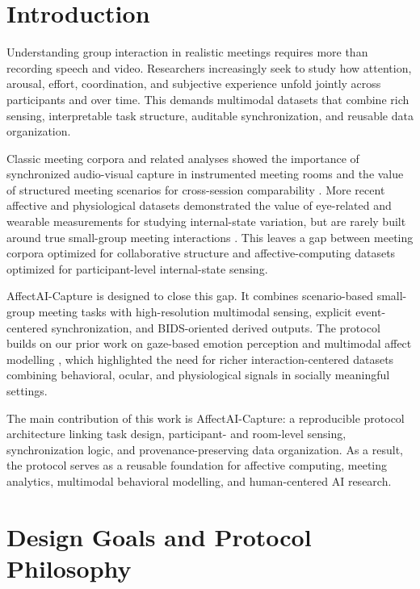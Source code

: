 \documentclass[runningheads]{llncs}
\begin{document}
\section{Introduction}

Understanding group interaction in realistic meetings requires more than recording speech and video. Researchers increasingly seek to study how attention, arousal, effort, coordination, and subjective experience unfold jointly across participants and over time. This demands multimodal datasets that combine rich sensing, interpretable task structure, auditable synchronization, and reusable data organization.

Classic meeting corpora and related analyses showed the importance of synchronized audio-visual capture in instrumented meeting rooms and the value of structured meeting scenarios for cross-session comparability \cite{carletta2005_ami,janin2003_icsi}. More recent affective and physiological datasets demonstrated the value of eye-related and wearable measurements for studying internal-state variation, but are rarely built around true small-group meeting interactions \cite{mirandacorrea2021_amigos}. This leaves a gap between meeting corpora optimized for collaborative structure and affective-computing datasets optimized for participant-level internal-state sensing.

AffectAI-Capture is designed to close this gap. It combines scenario-based small-group meeting tasks with high-resolution multimodal sensing, explicit event-centered synchronization, and BIDS-oriented derived outputs. The protocol builds on our prior work on gaze-based emotion perception and multimodal affect modelling \cite{seikavandi2023gaze,j2024modeling}, which highlighted the need for richer interaction-centered datasets combining behavioral, ocular, and physiological signals in socially meaningful settings.

The main contribution of this work is AffectAI-Capture: a reproducible protocol architecture linking task design, participant- and room-level sensing, synchronization logic, and provenance-preserving data organization. As a result, the protocol serves as a reusable foundation for affective computing, meeting analytics, multimodal behavioral modelling, and human-centered AI research.

\section{Design Goals and Protocol Philosophy}
\end{document}
